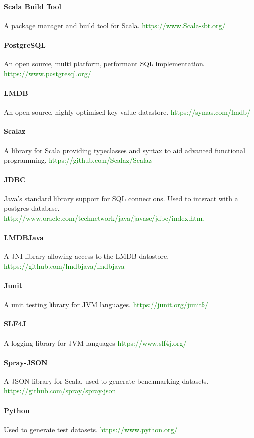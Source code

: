 \documentclass[12pt,a4paper,twoside,openright]{report}
\newcommand\toReference[1]{\textcolor{green}{#1}}
\begin{document}
\paragraph{Scala Build Tool} A package manager and build tool for Scala.
\toReference{https://www.Scala-sbt.org/}
\paragraph{PostgreSQL}  An open source, multi platform, performant SQL implementation.
\toReference{https://www.postgresql.org/}
\paragraph{LMDB} An open source, highly optimised key-value datastore.
\toReference{https://symas.com/lmdb/}
\paragraph{Scalaz} A library for Scala providing typeclasses and syntax to aid advanced functional programming. \toReference{https://github.com/Scalaz/Scalaz}
\paragraph{JDBC} Java's standard library support for SQL connections. Used to interact with a postgres database.
\toReference{http://www.oracle.com/technetwork/java/javase/jdbc/index.html}
\paragraph{LMDBJava} A JNI library allowing access to the LMDB datastore. 
\toReference{https://github.com/lmdbjava/lmdbjava}
\paragraph{Junit} A unit testing library for JVM languages.
\toReference{https://junit.org/junit5/}
\paragraph{SLF4J} A logging library for JVM languages
\toReference{https://www.slf4j.org/}
\paragraph{Spray-JSON} A JSON library for Scala, used to generate benchmarking datasets.
\toReference{https://github.com/spray/spray-json}
\paragraph{Python} Used to generate test datasets.
\toReference{https://www.python.org/}
\end{document}
